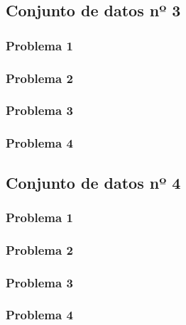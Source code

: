 \documentclass[11pt]{article}
\begin{document}
\begin{landscape}
\pagestyle{empty}
\subsection{Conjunto de datos nº 3}
\subsubsection{Problema 1}


\subsubsection{Problema 2}


\subsubsection{Problema 3}


\subsubsection{Problema 4}



\subsection{Conjunto de datos nº 4}
\subsubsection{Problema 1}


\subsubsection{Problema 2}


\subsubsection{Problema 3}


\subsubsection{Problema 4}


\end{landscape}
\end{document}
